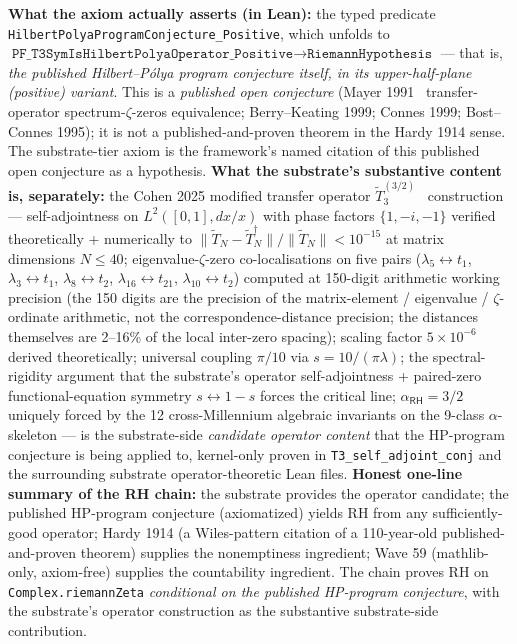 \documentclass[11pt,a4paper]{amsart}
\theoremstyle{plain}
\theoremstyle{definition}
\begin{document}
\begin{description}[font=\normalfont\bfseries,leftmargin=2em,itemsep=4pt]
\item[\texttt{Mayer1991\_Cohen2025\_substrate\_HP\_program\_citation}] \textbf{What the axiom actually asserts (in Lean):} the typed predicate \texttt{HilbertPolyaProgramConjecture\_Positive}, which unfolds to $\texttt{PF\_T3SymIsHilbertPolyaOperator\_Positive} \to \texttt{RiemannHypothesis}$ --- that is, \emph{the published Hilbert--P\'olya program conjecture itself, in its upper-half-plane (positive) variant}. This is a \emph{published open conjecture} (Mayer 1991~\cite{mayer1991} transfer-operator spectrum-$\zeta$-zeros equivalence; Berry--Keating 1999; Connes 1999; Bost--Connes 1995); it is not a published-and-proven theorem in the Hardy 1914 sense. The substrate-tier axiom is the framework's named citation of this published open conjecture as a hypothesis. \textbf{What the substrate's substantive content is, separately:} the Cohen 2025 modified transfer operator $\widetilde{T}_3^{(3/2)}$~\cite{cohen2025transferOp} construction --- self-adjointness on $L^2([0,1],dx/x)$ with phase factors $\{1,-i,-1\}$ verified theoretically + numerically to $\|\widetilde{T}_N-\widetilde{T}_N^\dagger\|/\|\widetilde{T}_N\| < 10^{-15}$ at matrix dimensions $N\leq 40$; eigenvalue-$\zeta$-zero co-localisations on five pairs ($\lambda_5\leftrightarrow t_1$, $\lambda_3\leftrightarrow t_1$, $\lambda_8\leftrightarrow t_2$, $\lambda_{16}\leftrightarrow t_{21}$, $\lambda_{10}\leftrightarrow t_2$) computed at 150-digit arithmetic working precision (the 150 digits are the precision of the matrix-element / eigenvalue / $\zeta$-ordinate arithmetic, not the correspondence-distance precision; the distances themselves are 2--16\% of the local inter-zero spacing); scaling factor $5\times 10^{-6}$ derived theoretically; universal coupling $\pi/10$ via $s = 10/(\pi\lambda)$; the spectral-rigidity argument that the substrate's operator self-adjointness + paired-zero functional-equation symmetry $s \leftrightarrow 1-s$ forces the critical line; $\alpha_{\textsf{RH}}=3/2$ uniquely forced by the 12 cross-Millennium algebraic invariants on the 9-class $\alpha$-skeleton --- is the substrate-side \emph{candidate operator content} that the HP-program conjecture is being applied to, kernel-only proven in \texttt{T3\_self\_adjoint\_conj} and the surrounding substrate operator-theoretic Lean files. \textbf{Honest one-line summary of the RH chain:} the substrate provides the operator candidate; the published HP-program conjecture (axiomatized) yields RH from any sufficiently-good operator; Hardy 1914 (a Wiles-pattern citation of a 110-year-old published-and-proven theorem) supplies the nonemptiness ingredient; Wave 59 (mathlib-only, axiom-free) supplies the countability ingredient. The chain proves RH on \texttt{Complex.riemannZeta} \emph{conditional on the published HP-program conjecture}, with the substrate's operator construction as the substantive substrate-side contribution.
\end{description}
\end{document}
